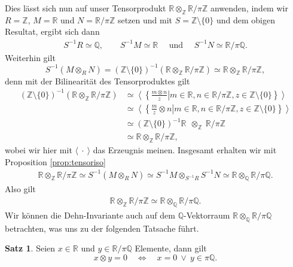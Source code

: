 \documentclass[11pt,titlepage]{article}
\newcommand{\setZ}{\mathbb{Z}}
\newcommand{\setQ}{\mathbb{Q}}
\newcommand{\setR}{\mathbb{R}}
\theoremstyle{definition}
\newtheorem{theorem}{Satz}[section]
\theoremstyle{remark}
\begin{document}
	Dies lässt sich nun auf unser Tensorprodukt 
	$\setR\otimes_{\setZ}\setR /\pi\setZ$ anwenden, indem wir $R=\setZ$, $M=\setR$ und $N=\setR /\pi\setZ$ setzen und mit 
	$S=\setZ\setminus\{0\}$ und dem obigen Resultat, ergibt sich 
	dann
	\begin{align*}
		S^{-1}R\simeq\setQ,\qquad S^{-1}M\simeq\setR
		\quad\text{ und }\quad S^{-1}N\simeq\setR /\pi\setQ.
	\end{align*}
	Weiterhin gilt
	\[S^{-1}(M\otimes_R N)=(\setZ\setminus\{0\})^{-1}(\setR\otimes_{\setZ}\setR/\pi\setZ)\simeq \setR\otimes_\setZ\setR/\pi\setZ,\]
	denn mit der Bilinearität des Tensorproduktes gilt
	\begin{align*}
		(\setZ\setminus\{0\})^{-1}(\setR\otimes_{\setZ}\setR /\pi\setZ)&\simeq
		\left.\left\langle \left\{\frac{m\otimes n}{z}\right\vert
		 m\in\setR,n\in\setR/\pi\setZ,z\in\setZ\setminus\{0\}\right\}\right\rangle \\
		 &\simeq \left.\left\langle \left\{\frac{m}{z}\otimes n\right\vert m\in\setR,n\in\setR/\pi\setZ,z\in\setZ\setminus\{0\}\right\}
		 \right\rangle \\
		 &\simeq (\setZ\setminus\{0\})^{-1}\setR\ \ \otimes_\setZ\  \setR/\pi\setZ \\
		 &\simeq \setR\otimes_\setZ \setR/\pi\setZ,
	\end{align*}
	wobei wir hier mit $\langle\ \cdot\ \rangle$ das Erzeugnis meinen.
	Insgesamt erhalten wir mit Proposition \ref{prop:tensoriso}
	\begin{align*}
		\setR\otimes_\setZ\setR/\pi\setZ\simeq S^{-1}(M\otimes_R N)\simeq S^{-1}M\otimes_{S^{-1}R}S^{-1}N\simeq\setR\otimes_\setQ\setR/\pi\setQ.
	\end{align*}
	Also gilt
	\begin{align}
		\setR\otimes_\setZ\setR/\pi\setZ\simeq\setR\otimes_\setQ\setR/\pi\setQ. \label{tensor=0}
	\end{align}
	Wir können die Dehn-Invariante auch auf dem $\setQ$-Vektorraum 
	$\setR\otimes_\setQ\setR/\pi\setQ$ betrachten, was uns zu der folgenden 
	Tatsache führt.
	
	\begin{theorem} \label{bem:dehn=0}
		Seien $x\in \setR$ und $y\in\setR/\pi\setQ$ Elemente, dann gilt
		\[ x\otimes y =0 \quad \Leftrightarrow \quad x=0 \ \lor\ y\in\pi\setQ.\]
	\end{theorem}
	
\end{document}
